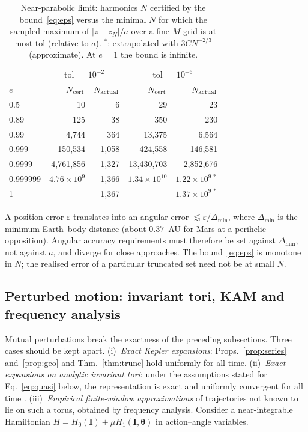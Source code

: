 \begin{table}[tb]
\caption{Near-parabolic limit: harmonics $N$ certified by the
bound~\eqref{eq:eps} versus the minimal $N$ for which the sampled maximum of $|z-z_N|/a$
over a fine $M$ grid is at most tol (relative to $a$). $^*$: extrapolated with $3CN^{-2/3}$ (approximate).
At $e=1$ the bound is infinite.}
\label{tab:nearpar}
\begin{ruledtabular}
\begin{tabular}{lrrrr}
 & \multicolumn{2}{c}{tol $=10^{-2}$} & \multicolumn{2}{c}{tol $=10^{-6}$}\\
$e$ & $N_{\rm cert}$ & $N_{\rm actual}$ & $N_{\rm cert}$ & $N_{\rm actual}$ \\
\hline
0.5 & 10 & 6 & 29 & 23 \\
0.89 & 125 & 38 & 350 & 230 \\
0.99 & 4,744 & 364 & 13,375 & 6,564 \\
0.999 & 150,534 & 1,058 & 424,558 & 146,581 \\
0.9999 & 4,761,856 & 1,327 & 13,430,703 & 2,852,676 \\
0.999999 & $4.76\times10^{9}$ & 1,366 & $1.34\times10^{10}$ & $1.22\times10^{9\,*}$ \\
1 & --- & 1,367 & --- & $1.37\times10^{9\,*}$ \\
\end{tabular}
\end{ruledtabular}
\end{table}

A position error $\varepsilon$ translates into an angular error
$\lesssim\varepsilon/\Delta_{\min}$, where $\Delta_{\min}$ is the minimum
Earth--body distance (about $0.37$~AU for Mars at a perihelic opposition).
Angular accuracy requirements must therefore be set against $\Delta_{\min}$,
not against $a$, and diverge for close approaches. The bound~\eqref{eq:eps} is
monotone in $N$; the realised error of a particular truncated set need not be
at small $N$.

\subsection{Perturbed motion: invariant tori, KAM and frequency analysis}
\label{sec:th-pert}

Mutual perturbations break the exactness of the preceding subsections. Three
cases should be kept apart. (i)~\emph{Exact Kepler expansions}:
Props.~\ref{prop:series} and~\ref{prop:geo} and Thm.~\ref{thm:trunc} hold
uniformly for all time. (ii)~\emph{Exact expansions on analytic invariant
tori}: under the assumptions stated for Eq.~\eqref{eq:quasi} below, the
representation is exact and uniformly convergent for all time
\cite{Laskar2003}. (iii)~\emph{Empirical finite-window approximations} of
trajectories not known to lie on such a torus, obtained by frequency analysis.
Consider a near-integrable
Hamiltonian $H=H_0(\mathbf I)+\mu H_1(\mathbf I,\boldsymbol\theta)$ in
action--angle variables.

